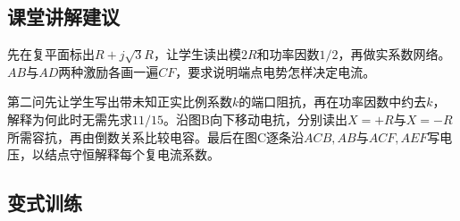 \documentclass[UTF8,fontset=fandol,a4paper,11pt]{ctexart}
\begin{document}
\subsection*{课堂讲解建议}

先在复平面标出$R+j\sqrt3R$，让学生读出模$2R$和功率因数$1/2$，再做实系数网络。$AB$与$AD$两种激励各画一遍$CF$，要求说明端点电势怎样决定电流。

第二问先让学生写出带未知正实比例系数$k$的端口阻抗，再在功率因数中约去$k$，解释为何此时无需先求$11/15$。沿图B向下移动电抗，分别读出$X=+R$与$X=-R$所需容抗，再由倒数关系比较电容。最后在图C逐条沿$ACB,AB$与$ACF,AEF$写电压，以结点守恒解释每个复电流系数。



\subsection*{变式训练}
\end{document}
